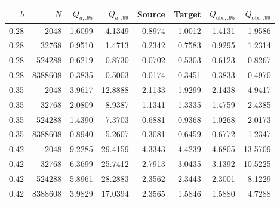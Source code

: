 \begin{tabular}{rrrrrrrr}
\toprule
$b$ & $N$ & $Q_{a,.95}$ & $Q_{a,.99}$ & Source & Target & $Q_{\mathrm{obs},.95}$ & $Q_{\mathrm{obs},.99}$ \\
\midrule
0.28 & 2048 & 1.6099 & 4.1349 & 0.8974 & 1.0012 & 1.4131 & 1.9586 \\
0.28 & 32768 & 0.9510 & 1.4713 & 0.2342 & 0.7583 & 0.9295 & 1.2314 \\
0.28 & 524288 & 0.6219 & 0.8730 & 0.0702 & 0.5303 & 0.6123 & 0.8267 \\
0.28 & 8388608 & 0.3835 & 0.5003 & 0.0174 & 0.3451 & 0.3833 & 0.4970 \\
0.35 & 2048 & 3.9617 & 12.8888 & 2.1133 & 1.9299 & 2.1438 & 4.9417 \\
0.35 & 32768 & 2.0809 & 8.9387 & 1.1341 & 1.3335 & 1.4759 & 2.4385 \\
0.35 & 524288 & 1.4390 & 7.3703 & 0.6881 & 0.9368 & 1.0268 & 2.0173 \\
0.35 & 8388608 & 0.8940 & 5.2607 & 0.3081 & 0.6459 & 0.6772 & 1.2347 \\
0.42 & 2048 & 9.2285 & 29.4159 & 4.3343 & 4.4239 & 4.6805 & 13.5709 \\
0.42 & 32768 & 6.3699 & 25.7412 & 2.7913 & 3.0435 & 3.1392 & 10.5225 \\
0.42 & 524288 & 5.8961 & 28.2883 & 2.3562 & 2.3443 & 2.3001 & 8.1229 \\
0.42 & 8388608 & 3.9829 & 17.0394 & 2.3565 & 1.5846 & 1.5880 & 4.7288 \\
\bottomrule
\end{tabular}
